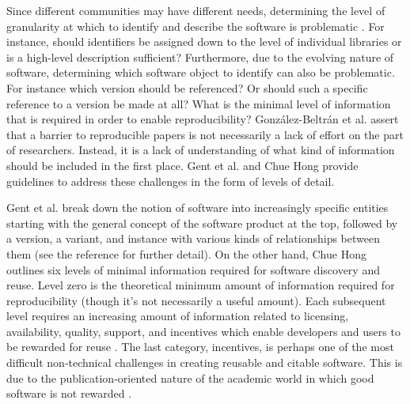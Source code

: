 \documentclass[letterpaper,11pt]{article}
\begin{document}
Since different communities may have different needs, determining the level of granularity at which to identify and describe the software is problematic \citep{jackson2012,gent2015}. For instance, should identifiers be assigned down to the level of individual libraries or is a high-level description sufficient? Furthermore, due to the evolving nature of software, determining which software object to identify can also be problematic. For instance which version should be referenced? Or should such a specific reference to a version be made at all? What is the minimal level of information that is required in order to enable reproducibility? Gonz\'alez-Beltr\'an et al. \citep{gonzalez-beltran2015} assert that a barrier to reproducible papers is not necessarily a lack of effort on the part of researchers. Instead, it is a lack of understanding of what kind of information should be included in the first place. Gent et al. \citep{gent2015} and Chue Hong \citep{hong2014} provide guidelines to address these challenges in the form of levels of detail. 

Gent et al. \citep{gent2015} break down the notion of software into increasingly specific entities starting with the general concept of the software product at the top, followed by a version, a variant, and instance with various kinds of relationships between them (see the reference for further detail). On the other hand, Chue Hong \citep{hong2014} outlines six levels of minimal information required for software discovery and reuse. Level zero is the theoretical minimum amount of information required for reproducibility (though it’s not necessarily a useful amount).  Each subsequent level requires an increasing amount of information related to licensing, availability, quality, support, and incentives which enable developers and users to be rewarded for reuse \citep{hong2014}. The last category, incentives, is perhaps one of the most difficult non-technical challenges in creating reusable and citable software. This is due to the publication-oriented nature of the academic world in which good software is not rewarded \citep{ahalt2015}. 
\end{document}
